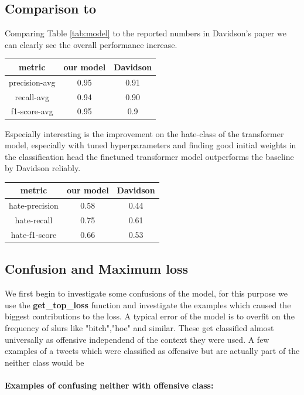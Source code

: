 \documentclass[11pt,a4paper]{article}
\begin{document}
\subsection{Comparison to \cite{auto_hatespeech}}
Comparing Table \ref{tab:model} to the reported numbers in Davidson's paper we can clearly see the overall performance increase.
\begin{table}[h]
  \begin{tabular}{c | c  c}
    metric & our model & Davidson \\
    \hline
    precision-avg &  0.95 & 0.91 \\
    recall-avg &  0.94 & 0.90 \\  
    f1-score-avg &  0.95 & 0.9 \\
  \end{tabular}
\end{table}

Especially interesting is the improvement on the hate-class of the transformer model, especially with tuned hyperparameters and
finding good initial weights in the classification head the finetuned transformer model outperforms the baseline by Davidson reliably.

\begin{table}[h]
  \begin{tabular}{c | c  c}
    metric & our model & Davidson \\
    \hline
    hate-precision &  0.58 & 0.44 \\
    hate-recall &  0.75 & 0.61 \\  
    hate-f1-score &  0.66 & 0.53 \\
  \end{tabular}
\end{table}

\subsection{Confusion and Maximum loss}
We first begin to investigate some confusions of the model, for this purpose we use the \textbf{get\_top\_loss} function and investigate the examples which
caused the biggest contributions to the loss.
A typical error of the model is to overfit on the frequency of slurs like "bitch","hoe" and similar.
These get classified almost universally as offensive independend of the context they were used.
A few examples of a tweets which were classified as offensive but are actually part of the neither class would be

\paragraph{Examples of confusing neither with offensive class:}
\begin{center}
   \newline
   \newline
   \newline
  \newline
\end{center}
\end{document}
